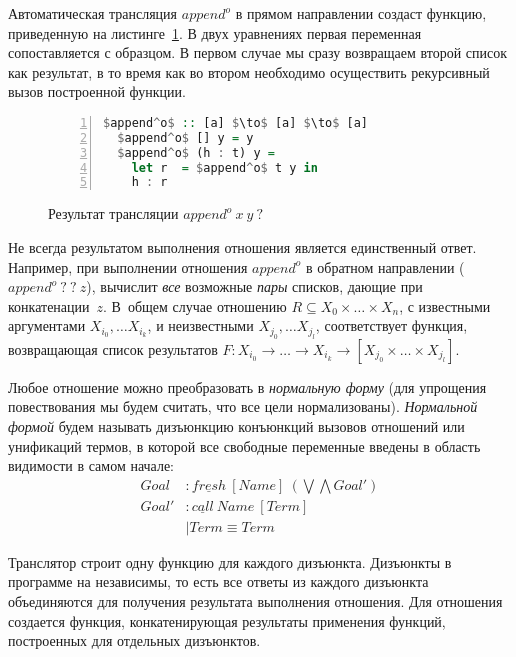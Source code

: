 \documentclass[conference,american,russian]{IEEEtran}
\begin{document}
Автоматическая трансляция $append^o$ в прямом направлении создаст функцию, приведенную на листинге~\ref{lst:appendoFWD}. 
В двух уравнениях первая переменная сопоставляется с образцом. 
В первом случае мы сразу возвращаем второй список как результат, в то время как во втором необходимо осуществить рекурсивный вызов построенной функции. 

\begin{figure}[h!]
  \begin{center}
  \begin{minipage}{0.35\textwidth}
  \begin{lstlisting}[language=Haskell, frame=single, numbers=left,numberstyle=\small, escapechar=|]
  $append^o$ :: [a] $\to$ [a] $\to$ [a]
  $append^o$ [] y = y
  $append^o$ (h : t) y =
    let r  = $append^o$ t y in 
    h : r 
  \end{lstlisting}
  \end{minipage}
  \end{center}
  \caption{Результат трансляции $append^o \ x \ y \ ?$}
  \label{lst:appendoFWD}
\end{figure}

Не всегда результатом выполнения отношения является единственный ответ.
Например, при выполнении отношения $append^o$ в обратном направлении ($append^o \ ? \ ? \ z$), \miniKanren{} вычислит \emph{все} возможные \emph{пары} списков, дающие при конкатенации~$z$. 
В~общем случае отношению $R \subseteq X_0 \times \dots \times X_n$, с известными аргументами $X_{i_0}, \dots X_{i_k}$, и неизвестными $X_{j_0}, \dots X_{j_l}$, соответствует функция, возвращающая список результатов $F : X_{i_0} \to \dots \to X_{i_k} \to [X_{j_0} \times \dots \times X_{j_l}]$. 

Любое отношение можно преобразовать в \emph{нормальную форму} (для упрощения повествования мы будем считать, что все цели нормализованы). 
\emph{Нормальной формой} будем называть дизъюнкцию конъюнкций вызовов отношений или унификаций термов, в которой все свободные переменные введены в область видимости в самом начале:
\begin{align*}
  Goal  &: \underline{fresh} \ [Name] \ (\bigvee \bigwedge Goal') \\
  Goal' &: \underline{call} \ Name \ [Term] \\
        &\mid Term \equiv Term 
\end{align*}

Транслятор строит одну функцию для каждого дизъюнкта. 
Дизъюнкты в программе на \miniKanren{} независимы, то есть все ответы из каждого дизъюнкта объединяются для получения результата выполнения отношения. 
Для отношения создается функция, конкатенирующая результаты применения функций, построенных для отдельных дизъюнктов. 
\end{document}
